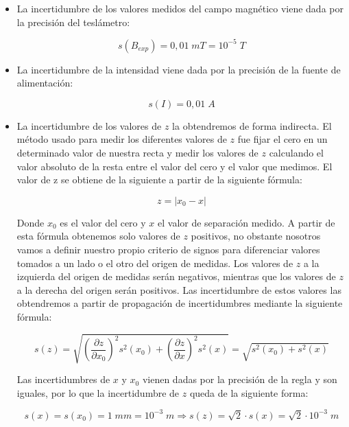 \documentclass[a4paper,12pt,titlepage]{report}
\begin{document}
\begin{itemize}
    \item La incertidumbre de los valores medidos del campo magnético viene dada por la precisión del teslámetro:
    
    \begin{equation}
        s(B_{exp}) = 0,01\; mT = 10^{-5} \; T
        \label{Inc campo magnético}
    \end{equation}

    \item La incertidumbre de la intensidad viene dada por la precisión de la fuente de alimentación:
    
    \begin{equation}
        s(I) = 0,01 \; A
        \label{Inc intensidad}
    \end{equation}

    \item La incertidumbre de los valores de $z$ la obtendremos de forma indirecta. El método usado para medir los diferentes valores de $z$ fue fijar el cero en un determinado valor de nuestra recta y medir los valores de $z$ calculando el valor absoluto de la resta entre el valor del cero y el valor que medimos. El valor de z se obtiene de la siguiente a partir de la siguiente fórmula:
    
    \begin{equation}
        z = \vert x_0 - x \vert
        \label{Calculo de z}
    \end{equation}

    Donde $x_0$ es el valor del cero y $x$ el valor de separación medido. A partir de esta fórmula obtenemos solo valores de $z$ positivos, no obstante nosotros vamos a definir nuestro propio criterio de signos para diferenciar valores tomados a un lado o el otro del origen de medidas. Los valores de $z$ a la izquierda del origen de medidas serán negativos, mientras que los valores de $z$ a la derecha del origen serán positivos. Las incertidumbre de estos valores las obtendremos a partir de propagación de incertidumbres mediante la siguiente fórmula:

    \begin{equation}
        s(z) = \sqrt{\left (\frac{\partial z}{\partial x_0}\right )^2 s^2(x_0)  + \left (\frac{\partial z}{\partial x} \right )^2 s^2(x)} = \sqrt{s^2(x_0) + s^2(x)}
    \end{equation}

    Las incertidumbres de $x$ y $x_0$ vienen dadas por la precisión de la regla y son iguales, por lo que la incertidumbre de $z$ queda de la siguiente forma:

    \begin{equation}
        s(x) = s(x_0) = 1 \; mm = 10^{-3} \; m \Rightarrow s(z) = \sqrt{2} \cdot s(x) = \sqrt{2} \cdot 10^{-3} \; m
        \label{Inc z}
    \end{equation}
\end{itemize}
\end{document}
